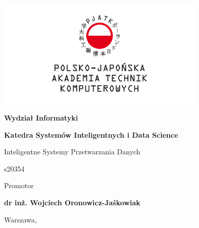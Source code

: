 \hypersetup{pageanchor=false}

\begin{titlepage}
    \makeatletter
    \begin{center}
        \includegraphics[width=0.75\textwidth]{figures/logo}

        \textbf{Wydział Informatyki}

        \vspace{1cm}

        \textbf{Katedra Systemów Inteligentnych i Data Science}

        Inteligentne Systemy Przetwarzania Danych

        \vspace{1cm}

        \textbf{\@author}

        s20354

        \vspace{1cm}

        \textbf{\large\@title}

        \vfill

        Promotor

\textbf{dr inż. Wojciech Oronowicz-Jaśkowiak}

        \vspace{2cm}

        Warszawa, \@date
    \end{center}

    \makeatother
\end{titlepage}
